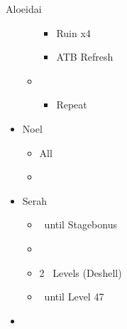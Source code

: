 \begin{battle}{Aloeidai}
\begin{flushleft}
\begin{itemize}
\begin{itemize}
                    \begin{itemize}
                      \item Ruin x4
                      \item ATB Refresh
                    \end{itemize}
              \item \first
                    \begin{itemize}
                      \item Repeat
                    \end{itemize}
            \end{itemize}
    \end{itemize}
  \end{flushleft}
\end{battle}




\begin{menu}
  \begin{itemize}
    \crystarium
    \begin{itemize}
      \item Noel
            \begin{itemize}
              \item All \rav
              \item {}
            \end{itemize}
      \item Serah
            \begin{itemize}
              \item \rav\ until Stagebonus
              \item \stagebonus{\sab}
              \item 2 \sab\ Levels (Deshell)
              \item \rav\ until Level 47
            \end{itemize}
    \end{itemize}
    \paradigm
    \begin{itemize}
      \item {}%
            {\paradigmline{\com}{\com}{\nek}{\X}}%
            {\paradigmline{\com}{\com}{\nek}{\W}}%
            {\paradigmline[3]{\textit{\rav}}{\textit{(\sab)}}{\textit{\nek}}{\textit{\W}}}%
            {\paradigmline{\sen}{\sen}{\nek}{\W}}%
            {\paradigmline{\rav}{\rav}{\nek}{\W}}%
            {\paradigmline{\rav}{\rav}{\nek}{\W}}
    \end{itemize}
  \end{itemize}
\end{menu}

